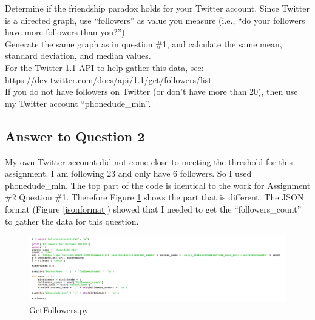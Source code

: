 \documentclass{article}
\begin{document}
Determine if the friendship paradox holds for your Twitter account. Since Twitter is a directed graph, use ``followers'' as value you measure (i.e., ``do your followers have more followers than you?'') \\

Generate the same graph as in question \#1, and calculate the same mean, standard deviation, and median values. \\

For the Twitter 1.1 API to help gather this data, see: \\

\url{https://dev.twitter.com/docs/api/1.1/get/followers/list} \\

If you do not have followers on Twitter (or don't have more than 20), then use my Twitter account ``phonedude\_mln''.


\subsection*{Answer to Question 2}

My own Twitter account did not come close to meeting the threshold for this assignment. I am following 23 and only have 6 followers. So I used phonedude\_mln. The top part of the code is identical to the work for Assignment \#2 Question \#1. Therefore Figure \ref{GetFollowersCode} shows the part that is different. The JSON format (Figure \ref{jsonformat}) showed that I needed to get the ``followers\_count'' to gather the data for this question.

\begin{figure}[H]
\centering
\includegraphics[scale=0.25]{q2/GetFollowersCode}
\caption{GetFollowers.py}
\label{GetFollowersCode}
\end{figure}
\end{document}
